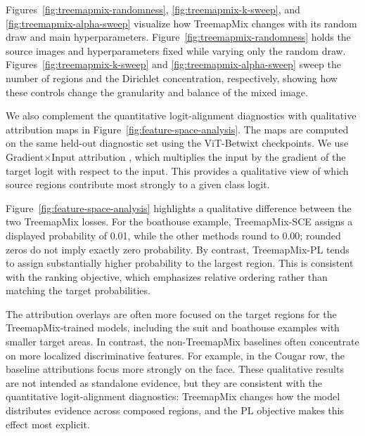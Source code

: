 Figures~\ref{fig:treemapmix-randomness}, \ref{fig:treemapmix-k-sweep}, and
\ref{fig:treemapmix-alpha-sweep} visualize how TreemapMix changes with its
random draw and main hyperparameters. Figure~\ref{fig:treemapmix-randomness}
holds the source images and hyperparameters fixed while varying only the
random draw. Figures~\ref{fig:treemapmix-k-sweep} and
\ref{fig:treemapmix-alpha-sweep} sweep the number of regions and the
Dirichlet concentration, respectively, showing how these controls change the
granularity and balance of the mixed image.







We also complement the quantitative logit-alignment diagnostics with
qualitative attribution maps in Figure~\ref{fig:feature-space-analysis}. The
maps are computed on the same held-out diagnostic set using the ViT-Betwixt
checkpoints. We use Gradient$\times$Input attribution
\citep{shrikumarNotJustBlack2017a,simonyanDeepConvolutionalNetworks2014},
which multiplies the input by the gradient of the target logit with respect to
the input. This provides a qualitative view of which source regions contribute
most strongly to a given class logit.

Figure~\ref{fig:feature-space-analysis} highlights a qualitative difference
between the two TreemapMix losses. For the boathouse example, TreemapMix-SCE assigns a displayed probability
of 0.01, while the other methods round to 0.00; rounded zeros do not imply
exactly zero probability. By contrast,
TreemapMix-PL tends to assign substantially higher probability to the largest
region. This is consistent with the ranking objective, which emphasizes relative
ordering rather than matching the target probabilities.

The attribution overlays are often more focused on the target regions for the
TreemapMix-trained models, including the suit and boathouse examples with smaller target areas. In contrast, the non-TreemapMix baselines often concentrate
on more localized discriminative features. For example, in the Cougar row, the
baseline attributions focus more strongly on the face. These qualitative
results are not intended as standalone evidence, but they are consistent with
the quantitative logit-alignment diagnostics: TreemapMix changes how the model
distributes evidence across composed regions, and the PL objective makes this
effect most explicit.



